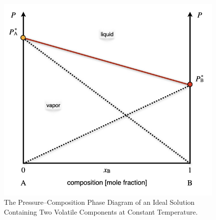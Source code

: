 \documentclass[
  9pt,
]{extbook}
\theoremstyle{definition}
\theoremstyle{definition}
\theoremstyle{definition}
\theoremstyle{remark}
\begin{document}
\begin{figure}

{\centering \includegraphics[width=0.6\linewidth]{./img/OEP_Figures.020} 

}

\caption{The Pressure–Composition Phase Diagram of an Ideal Solution Containing Two Volatile Components at Constant Temperature.}\label{fig:FigMC2}
\end{figure}
\end{document}
